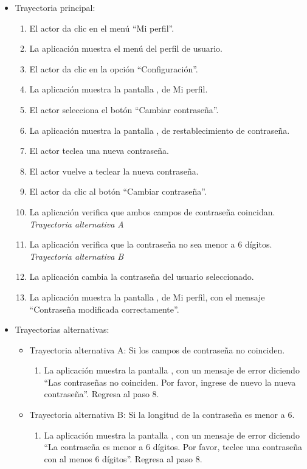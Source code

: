 			\begin{itemize}
				\item Trayectoria principal:
					\begin{enumerate}
						\item El actor da clic en el menú ``Mi perfil''.
						\item La aplicación muestra el menú del perfil de usuario.
						\item El actor da clic en la opción ``Configuración''.
						\item La aplicación muestra la pantalla , de Mi perfil.
						\item El actor selecciona el botón ``Cambiar contraseña''.
						\item La aplicación muestra la pantalla , de restablecimiento de contraseña.
						\item El actor teclea una nueva contraseña.
						\item El actor vuelve a teclear la nueva contraseña.
						\item El actor da clic al botón ``Cambiar contraseña''.
						\item La aplicación verifica que ambos campos de contraseña coincidan. \textsl{Trayectoria alternativa A}
						\item La aplicación verifica que la contraseña no sea menor a 6 dígitos. \textsl{Trayectoria alternativa B}
						\item La aplicación cambia la contraseña del usuario seleccionado.
						\item La aplicación muestra la pantalla , de Mi perfil, con el mensaje ``Contraseña modificada correctamente''.
					\end{enumerate}
				\item Trayectorias alternativas:
					\begin{itemize}
						\item Trayectoria alternativa A: Si los campos de contraseña no coinciden.
							\begin{enumerate}
								\item La aplicación muestra la pantalla , con un mensaje de error diciendo ``Las contraseñas no coinciden. Por favor, ingrese de nuevo la nueva contraseña''. Regresa al paso 8.
							\end{enumerate}
						\item Trayectoria alternativa B: Si la longitud de la contraseña es menor a 6.
							\begin{enumerate}
								\item La aplicación muestra la pantalla , con un mensaje de error diciendo ``La contraseña es menor a 6 dígitos. Por favor, teclee una contraseña con al menos 6 dígitos''. Regresa al paso 8.
							\end{enumerate}
					\end{itemize}
			\end{itemize}
			
